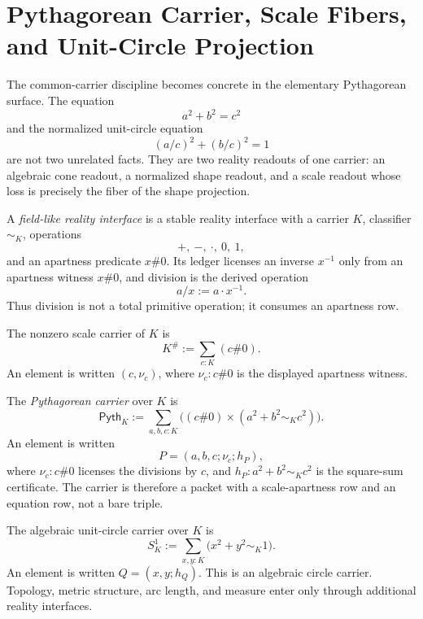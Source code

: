 \section{Pythagorean Carrier, Scale Fibers, and Unit-Circle Projection}
\label{sec:unified-reality-pythagorean-common-carrier}

The common-carrier discipline becomes concrete in the elementary
Pythagorean surface. The equation
$$
a^2+b^2=c^2
$$
and the normalized unit-circle equation
$$
(a/c)^2+(b/c)^2=1
$$
are not two unrelated facts. They are two reality readouts of one
carrier: an algebraic cone readout, a normalized shape readout, and a
scale readout whose loss is precisely the fiber of the shape projection.

\begin{definition}
\label{def:unified-reality-field-like-interface}
A \emph{field-like reality interface} is a stable reality interface with
a carrier $K$, classifier $\sim_K$, operations
$$
+,\ -,\ \cdot,\ 0,\ 1,
$$
and an apartness predicate $x\#0$. Its ledger licenses an inverse
$x^{-1}$ only from an apartness witness $x\#0$, and division is the
derived operation
$$
a/x:=a\cdot x^{-1}.
$$
Thus division is not a total primitive operation; it consumes an
apartness row.
\end{definition}

\begin{definition}
\label{def:unified-reality-nonzero-scale-carrier}
The nonzero scale carrier of $K$ is
$$
K^\#:=\sum_{c:K}(c\#0).
$$
An element is written $(c,\nu_c)$, where $\nu_c:c\#0$ is the displayed
apartness witness.
\end{definition}

\begin{definition}
\label{def:unified-reality-pythagorean-carrier}
The \emph{Pythagorean carrier} over $K$ is
$$
\mathsf{Pyth}_K
:=
\sum_{a,b,c:K}
\bigl((c\#0)\times(a^2+b^2\sim_K c^2)\bigr).
$$
An element is written
$$
P=(a,b,c;\nu_c;h_P),
$$
where $\nu_c:c\#0$ licenses the divisions by $c$, and
$h_P:a^2+b^2\sim_K c^2$ is the square-sum certificate. The carrier is
therefore a packet with a scale-apartness row and an equation row, not a
bare triple.
\end{definition}

\begin{definition}
\label{def:unified-reality-unit-circle-carrier}
The algebraic unit-circle carrier over $K$ is
$$
S^1_K
:=
\sum_{x,y:K}
\bigl(x^2+y^2\sim_K1\bigr).
$$
An element is written $Q=(x,y;h_Q)$. This is an algebraic circle
carrier. Topology, metric structure, arc length, and measure enter only
through additional reality interfaces.
\end{definition}

